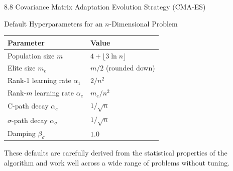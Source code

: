 \documentclass[aspectratio=169,10pt]{beamer}
\begin{document}
\begin{frame}[allowframebreaks]{8.8 Covariance Matrix Adaptation Evolution Strategy (CMA-ES)}
\begin{block}{Default Hyperparameters for an $n$-Dimensional Problem}
\begin{center}
\begin{tabular}{ll}
\toprule
Parameter & Value \\
\midrule
Population size $m$ & $4 + \lfloor 3 \ln n \rfloor$ \\
Elite size $m_e$ & $m / 2$ (rounded down) \\
Rank-1 learning rate $\alpha_1$ & $2 / n^2$ \\
Rank-$m$ learning rate $\alpha_e$ & $m_e / n^2$ \\
C-path decay $\alpha_c$ & $1/\sqrt{n}$ \\
$\sigma$-path decay $\alpha_\sigma$ & $1/\sqrt{n}$ \\
Damping $\beta_\sigma$ & $1.0$ \\
\bottomrule
\end{tabular}
\end{center}
These defaults are carefully derived from the statistical properties of the algorithm and work well across a wide range of problems without tuning.
\end{block}

\end{frame}
\end{document}
